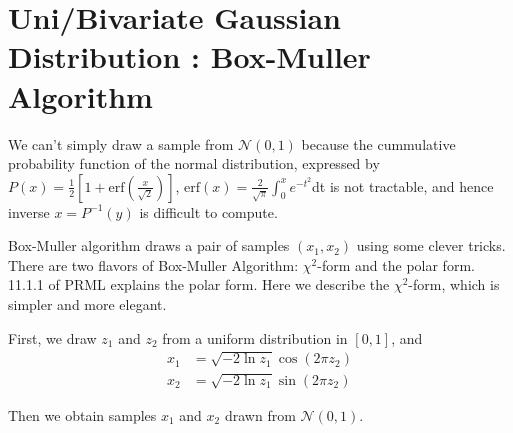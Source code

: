 \documentclass[a4]{article}
\begin{document}
\section{Uni/Bivariate Gaussian Distribution : Box-Muller Algorithm}
We can't simply draw a sample from $\mathcal{N}(0,1)$ because the cummulative probability function
of the normal distribution, expressed by
$P(x) = \frac{1}{2}\left[ 1 + \text{erf}\left(\frac{x}{\sqrt{2}}\right) \right]$,
$\text{erf}(x) = \frac{2}{\sqrt{\pi}}\int_0^x e^{-t^2}$dt
is not tractable, and hence inverse $x = P^{-1}(y)$ is difficult to compute.

Box-Muller algorithm \cite{BoxMull58} draws a pair of samples $(x_1, x_2)$ using some clever tricks.
There are two flavors of Box-Muller Algorithm: $\chi^2$-form and the polar form.
11.1.1 of PRML \cite{bishop2007} explains the polar form. Here we describe the $\chi^2$-form, which is
simpler and more elegant.

First, we draw $z_1$ and $z_2$ from a uniform distribution in $[0,1]$, and
\begin{equation}
\begin{aligned}
x_1 &= \sqrt{-2\ln z_1}\cos(2\pi z_2)\\
x_2 &= \sqrt{-2\ln z_1}\sin(2\pi z_2)
\end{aligned}
\end{equation}

Then we obtain samples $x_1$ and $x_2$ drawn from $\mathcal{N}(0,1)$.
\end{document}
